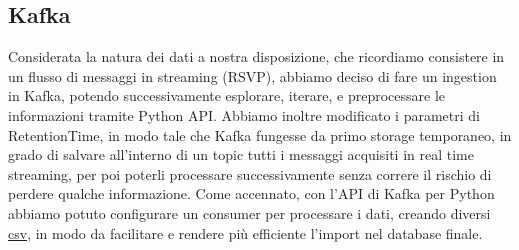 \documentclass[fleqn,10pt]{SelfArx} %
\begin{document}
{\subsection{Kafka} %
Considerata la natura dei dati a nostra disposizione, che ricordiamo consistere in un flusso di messaggi in streaming (RSVP), abbiamo deciso di fare un ingestion in Kafka, potendo successivamente esplorare, iterare, e preprocessare le informazioni tramite Python API.
Abbiamo inoltre modificato i parametri di RetentionTime, in modo tale che Kafka fungesse da primo storage temporaneo, in grado di salvare all'interno di un topic tutti i messaggi acquisiti in real time streaming, per poi poterli processare successivamente senza correre il rischio di perdere qualche informazione.
Come accennato, con l'API di Kafka per Python abbiamo potuto configurare un consumer per processare i dati, creando diversi \href{https://github.com/DBertazioli/NeoMeetup/tree/master/csv/struttura}{csv}, %
 in modo da facilitare e rendere più efficiente l'import nel database finale.
}
\end{document}
